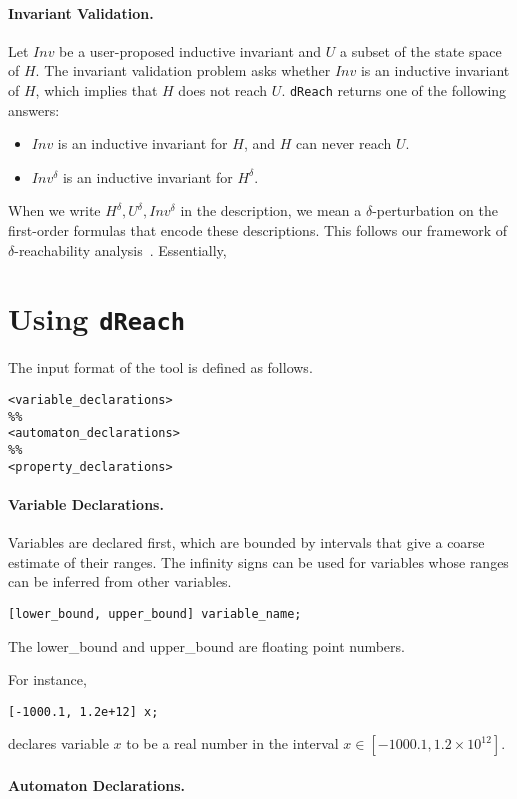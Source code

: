 \documentclass[envcountsect]{llncs}
\begin{document}
\paragraph{Invariant Validation.} Let $Inv$ be a user-proposed inductive
invariant and $U$ a subset of the state space of $H$. The invariant validation
problem asks whether $Inv$ is an inductive invariant of $H$, which implies that
$H$ does not reach $U$. 
{\tt dReach} returns
one of the following answers:
\begin{itemize}
 \item $Inv$ is an inductive invariant for $H$, and $H$ can never reach $U$.
 \item $Inv^{\delta}$ is an inductive invariant for $H^{\delta}$. 
 \end{itemize}

When we write $H^{\delta}, U^{\delta}, Inv^{\delta}$ in the description, we
mean a $\delta$-perturbation on the first-order formulas that encode these
descriptions. This follows our framework of $\delta$-reachability
analysis~\cite{}. Essentially, 

\section{Using {\tt dReach}}

The input format of the tool is defined as follows. 
\begin{verbatim}
<variable_declarations>
%%
<automaton_declarations>
%%
<property_declarations>
\end{verbatim}

\paragraph{Variable Declarations.} Variables are declared first, which are
bounded by intervals that give a coarse estimate of their ranges. The infinity
signs can be used for variables whose ranges can be inferred from other
variables.
\begin{verbatim}
[lower_bound, upper_bound] variable_name;
\end{verbatim}
The lower\_bound and upper\_bound are floating point numbers. 

For instance,
\begin{verbatim}
[-1000.1, 1.2e+12] x;
\end{verbatim}
declares variable $x$ to be a real number in the interval $x\in [-1000.1,
1.2\times 10^{12}].$

\paragraph{Automaton Declarations.}
\end{document}
